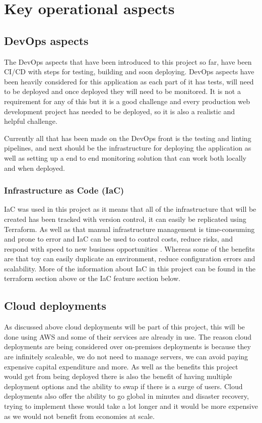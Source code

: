 \documentclass[]{project_report}
\begin{document}
\section{Key operational aspects}

\subsection{DevOps aspects}

The DevOps aspects that have been introduced to this project so far, have been CI/CD with steps for testing, building and soon deploying. DevOps aspects have been heavily considered for this application as each part of it has tests, will need to be deployed and once deployed they will need to be monitored. It is not a requirement for any of this but it is a good challenge and every production web development project has needed to be deployed, so it is also a realistic and helpful challenge.

Currently all that has been made on the DevOps front is the testing and linting pipelines, and next should be the infrastructure for deploying the application as well as setting up a end to end monitoring solution that can work both locally and when deployed.

\subsubsection{Infrastructure as Code (IaC)}

IaC was used in this project as it means that all of the infrastructure that will be created has been tracked with version control, it can easily be replicated using Terraform. As well as that manual infrastructure management is time-consuming and prone to error and IaC can be used to control costs, reduce risks, and respond with speed to new business opportunities \cite{aws_iac}. Whereas some of the benefits are that toy can easily duplicate an environment, reduce configuration errors and scalability. More of the information about IaC in this project can be found in the terraform section above or the IaC feature section below.

\subsection{Cloud deployments}

As discussed above cloud deployments will be part of this project, this will be done using AWS and some of their services are already in use. The reason cloud deployments are being considered over on-premises deployments is because they are infinitely scaleable, we do not need to manage servers, we can avoid paying expensive capital expenditure and more. As well as the benefits this project would get from being deployed there is also the benefit of having multiple deployment options and the ability to swap if there is a surge of users. Cloud deployments also offer the ability to go global in minutes \cite{aws_benefits} and disaster recovery, trying to implement these would take a lot longer and it would be more expensive as we would not benefit from economies at scale.
\end{document}
